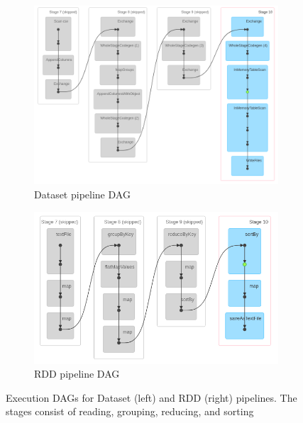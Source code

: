 \documentclass[sigconf,nonacm]{acmart}
\begin{document}
\begin{figure}[h]
  \centering
  \begin{subfigure}[t]{0.48\linewidth}
    \centering
    \includegraphics[width=\linewidth]{figs/dag-dataset.png}
    \caption{Dataset pipeline DAG}
    \label{fig:dag-dataset}
  \end{subfigure}
  \hfill
  \begin{subfigure}[t]{0.48\linewidth}
    \centering
    \includegraphics[width=\linewidth]{figs/dag-rdd.png}
    \caption{RDD pipeline DAG}
    \label{fig:dag-rdd}
  \end{subfigure}
  \caption{Execution DAGs for Dataset (left) and RDD (right) pipelines. The stages consist of reading, grouping, reducing, and sorting}
  \label{fig:dag-side-by-side}
\end{figure}
\end{document}
